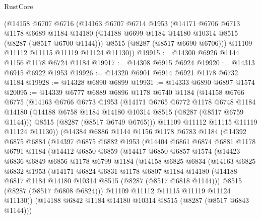 \begin{lexlean}{RustCore}
\begin{coremodule}
    (@14158
      @6707
      @6716
      (@14163
        @6707
        @6714
        @1953
        (@14171
          @6706
          @6713
          @1178
          @6689
          @1184
          @14180
          (@14188 @6699 @1184 @14180 @10314 @8515 (@8287 (@8517 @6700 @1144)))
          @8515
          (@8287 (@8517 @6690 @6706)))
        @11109
        @11112
        @11115
        @11119
        @11124
        @11130))
@19915 := @14300 @6926 @1144 @1156 @1178 @6724 @1184
@19917 := @14308 @6915 @6924
@19920 := @14313 @6915 @6922 @1953
@19926 := @14320 @6901 @6914 @6921 @1178 @6732 @1184
@19928 := @14328 @6890 @6899
@19931 := @14333 @6890 @6897 @1574
@20095 := @14339
    @6777
    @6889
    @6896
    @1178
    @6740
    @1184
    (@14158
      @6766
      @6775
      (@14163
        @6766
        @6773
        @1953
        (@14171
          @6765
          @6772
          @1178
          @6748
          @1184
          @14180
          (@14188 @6758 @1184 @14180 @10314 @8515 (@8287 (@8517 @6759 @1144)))
          @8515
          (@8287 (@8517 @6749 @6765)))
        @11109
        @11112
        @11115
        @11119
        @11124
        @11130))
    (@14384
      @6886
      @1144
      @1156
      @1178
      @6783
      @1184
      (@14392
        @6875
        @6884
        (@14397
          @6875
          @6882
          @1953
          (@14404
            @6861
            @6874
            @6881
            @1178
            @6791
            @1184
            (@14412
              @6850
              @6859
              (@14417
                @6850
                @6857
                @1574
                (@14423
                  @6836
                  @6849
                  @6856
                  @1178
                  @6799
                  @1184
                  (@14158
                    @6825
                    @6834
                    (@14163
                      @6825
                      @6832
                      @1953
                      (@14171
                        @6824
                        @6831
                        @1178
                        @6807
                        @1184
                        @14180
                        (@14188 @6817 @1184 @14180 @10314 @8515 (@8287 (@8517 @6818 @1144)))
                        @8515
                        (@8287 (@8517 @6808 @6824)))
                      @11109
                      @11112
                      @11115
                      @11119
                      @11124
                      @11130))
                  (@14188 @6842 @1184 @14180 @10314 @8515 (@8287 (@8517 @6843 @1144)))

\end{coremodule}
\end{lexlean}
